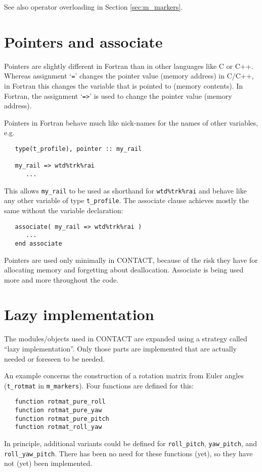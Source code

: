 \documentclass[12pt]{report}
\begin{document}
See also operator overloading in Section \ref{sec:m_markers}.

\section{Pointers and associate}

Pointers are slightly different in Fortran than in other languages like C
or C++. Whereas assignment `{\tt =}' changes the pointer value (memory
address) in C/C++, in Fortran this changes the variable that is pointed to
(memory contents). In Fortran, the assignment `{\tt =>}' is used to change
the pointer value (memory address).

Pointers in Fortran behave much like nick-names for the names of other
variables, e.g.\
{\small\begin{verbatim}
   type(t_profile), pointer :: my_rail

   my_rail => wtd%trk%rai
      ...
\end{verbatim}}
This allows {\tt my\_rail} to be used as shorthand for {\tt wtd\%trk\%rai}
and behave like any other variable of type {\tt t\_profile}. The associate
clause achieves mostly the same without the variable declaration:
{\small\begin{verbatim}
   associate( my_rail => wtd%trk%rai )
      ...
   end associate
\end{verbatim}}
Pointers are used only minimally in CONTACT, because of the risk they have
for allocating memory and forgetting about deallocation. Associate is being
used more and more throughout the code.

\section{Lazy implementation}
\label{sec:lazy_implem}

The modules/objects used in CONTACT are expanded using a strategy called
``lazy implementation''. Only those parts are implemented that are actually
needed or foreseen to be needed.

An example concerns the construction of a rotation matrix from Euler angles
({\tt t\_rotmat} in {\tt m\_\-mar\-kers}). Four functions are defined for this:
{\small\begin{verbatim}
   function rotmat_pure_roll
   function rotmat_pure_yaw
   function rotmat_pure_pitch
   function rotmat_roll_yaw
\end{verbatim}}
In principle, additional variants could be defined for {\tt roll\_pitch}, 
{\tt yaw\_pitch}, and {\tt roll\_\-yaw\_\-pitch}. There has been no need for
these functions (yet), so they have not (yet) been implemented.
\end{document}
